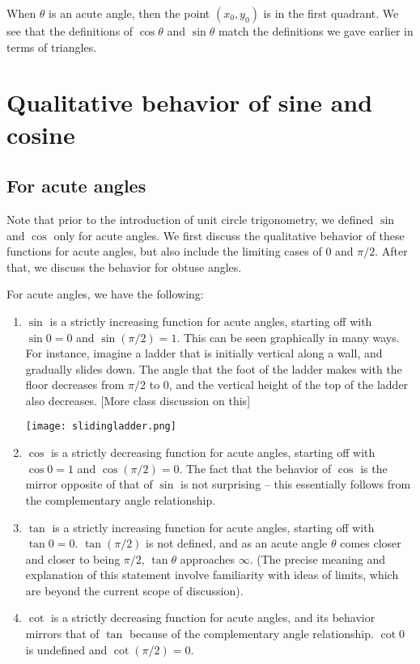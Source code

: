 \documentclass{amsart}
\begin{document}
When $\theta$ is an acute angle, then the point $(x_0,y_0)$ is in the
first quadrant. We see that the definitions of $\cos \theta$ and $\sin
\theta$ match the definitions we gave earlier in terms of
triangles.

\section{Qualitative behavior of sine and cosine}

\subsection{For acute angles}

Note that prior to the introduction of unit circle trigonometry, we
defined $\sin$ and $\cos$ only for acute angles. We first discuss the
qualitative behavior of these functions for acute angles, but also
include the limiting cases of $0$ and $\pi/2$. After
that, we discuss the behavior for obtuse angles.

For acute angles, we have the following:

\begin{enumerate}
\item $\sin$ is a strictly increasing function for acute angles,
  starting off with $\sin 0 = 0$ and $\sin (\pi/2) =
  1$. This can be seen graphically in many ways. For instance, imagine
  a ladder that is initially vertical along a wall, and gradually
  slides down. The angle that the foot of the ladder makes with the
  floor decreases from $\pi/2$ to $0$, and the vertical
  height of the top of the ladder also decreases. [More class
  discussion on this]

  \texttt{[image: slidingladder.png]}

  \vspace{2in}
\item $\cos$ is a strictly decreasing function for acute angles,
  starting off with $\cos 0 = 1$ and $\cos (\pi/2) =
  0$. The fact that the behavior of $\cos$ is the mirror opposite of
  that of $\sin$ is not surprising -- this essentially follows from
  the complementary angle relationship.
  \vspace{1in}
\item $\tan$ is a strictly increasing function for acute angles,
  starting off with $\tan 0 = 0$. $\tan (\pi/2)$ is not
  defined, and as an acute angle $\theta$ comes closer and closer to
  being $\pi/2$, $\tan \theta$ approaches $\infty$. (The precise
  meaning and explanation of this statement involve familiarity with
  ideas of limits, which are beyond the current scope of discussion).
\item $\cot$ is a strictly decreasing function for acute angles, and
  its behavior mirrors that of $\tan$ because of the complementary
  angle relationship. $\cot 0$ is undefined and $\cot
  (\pi/2) = 0$.
\end{enumerate}
\end{document}
